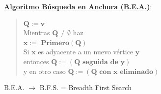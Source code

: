 \documentclass[ebook,oneside]{memoir}
\newcommand{\bolds}[1]{\boldsymbol{#1}}
\begin{document}
\vspace{1cm}
\noindent\underline{\textbf{Algoritmo B\'{u}squeda en Anchura (B.E.A.)}}:

        \begin{quotation}
        \noindent $\bolds{Q:=v}$\\[1ex]
        \textsf{Mientras} $\bolds{Q\neq\emptyset}$ \textsf{haz}\\[1ex]
        \hspace*{5ex} $\bolds{x:=\mbox{ Primero}(Q)}$\\[1ex]
        \hspace*{5ex} \textsf{Si} $\bolds{x}$ es adyacente a un nuevo v\'{e}rtice $\bolds{y}$\\[1ex]
        \hspace*{10ex} \textsf{entonces} $\bolds{Q:=(Q\mbox{ seguida de }y)}$\\[1ex]
        \hspace*{10ex} \textsf{y en otro caso} $\bolds{Q:=(Q\mbox{ con }x\mbox{ eliminado})}$
        \end{quotation}

\vspace{0.4cm}
        B.E.A. $\rightarrow$ B.F.S. = Breadth First Search
\vspace{0.4cm}
\end{document}
